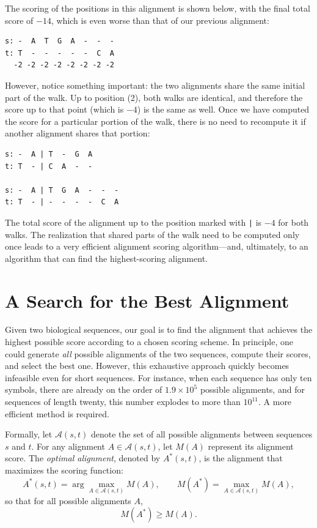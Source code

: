 The scoring of the positions in this alignment is shown below, with the final total score of $-14$, which is even worse than that of our previous alignment:

\begin{verbatim}
s: -  A  T  G  A  -  -  -
t: T  -  -  -  -  -  C  A
  -2 -2 -2 -2 -2 -2 -2 -2
\end{verbatim}

However, notice something important: the two alignments share the same initial part of the walk. Up to position (2), both walks are identical, and therefore the score up to that point (which is $-4$) is the same as well. Once we have computed the score for a particular portion of the walk, there is no need to recompute it if another alignment shares that portion:

\begin{verbatim}
s: -  A | T  -  G  A
t: T  - | C  A  -  -

s: -  A | T  G  A  -  -  -
t: T  - | -  -  -  -  C  A
\end{verbatim}

The total score of the alignment up to the position marked with {\tt |} is $-4$ for both walks. The realization that shared parts of the walk need to be computed only once leads to a very  efficient alignment scoring algorithm—and, ultimately, to an algorithm that can find the  highest-scoring alignment.

\section{A Search for the Best Alignment}

Given two biological sequences, our goal is to find the alignment that achieves the highest possible score according to a chosen scoring scheme. In principle, one could generate \emph{all} possible alignments of the two sequences, compute their scores, and select the best one. However, this exhaustive approach quickly becomes infeasible even for short sequences. For instance, when each sequence has only ten symbols, there are already on the order of $1.9\times 10^5$ possible alignments, and for sequences of length twenty, this number explodes to more than $10^{11}$. A more efficient method is required.

Formally, let $\mathcal{A}(s,t)$ denote the set of all possible alignments between sequences $s$ and $t$. 
For any alignment $A \in \mathcal{A}(s,t)$, let $M(A)$ represent its alignment score. 
The \emph{optimal alignment}, denoted by $A^*(s,t)$, is the alignment that maximizes the scoring function:
\[
A^*(s,t) = \arg\max_{A \in \mathcal{A}(s,t)} M(A),
\qquad
M(A^*) = \max_{A \in \mathcal{A}(s,t)} M(A),
\]
%
so that for all possible alignments $A$,
%
\[
M(A^*) \ge M(A).
\]

